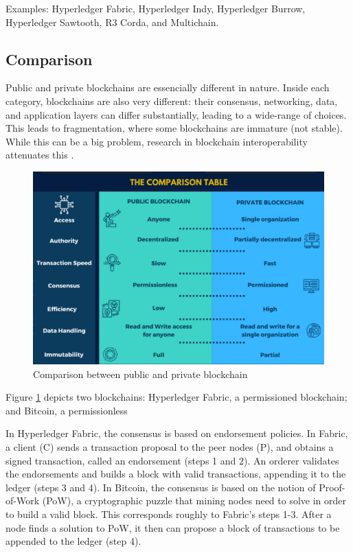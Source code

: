 \documentclass[12pt,a4paper]{article}
\theoremstyle{definition}
\begin{document}
Examples: Hyperledger Fabric, Hyperledger Indy, Hyperledger Burrow, Hyperledger Sawtooth, R3 Corda, and Multichain.

\subsection{Comparison}
Public and private blockchains are essencially different in nature. Inside each category, blockchains are also very different: their consensus, networking, data, and application layers can differ substantially, leading to a wide-range of choices. This leads to fragmentation, where some blockchains are immature (not stable). While this can be a big problem, research in blockchain interoperability attenuates this \cite{belchior2020}. 

\begin{figure}[H]
    \centering
    \includegraphics[scale=0.45]{figures/PublicVsPrivate.png}
    \caption{Comparison between public and private blockchain}
    \label{fig:bcs}
\end{figure}



Figure \ref{fig:bcs} depicts two blockchains: Hyperledger Fabric, a permissioned blockchain; and Bitcoin, a permissionless

In Hyperledger Fabric, the consensus is based on endorsement policies. In Fabric, a client (C) sends a transaction proposal to the peer nodes (P), and obtains a signed transaction, called an endorsement (steps 1 and 2). An orderer validates the endorsements and builds a block with valid transactions, appending it to the ledger (steps 3 and 4). In Bitcoin, the consensus is based on the notion of Proof-of-Work (PoW), a cryptographic puzzle that mining nodes need to solve in order to build a valid block. This corresponds roughly to Fabric’s steps 1-3. After a node finds a solution to PoW, it then can propose a block of transactions to be appended to the ledger (step 4).
\end{document}
